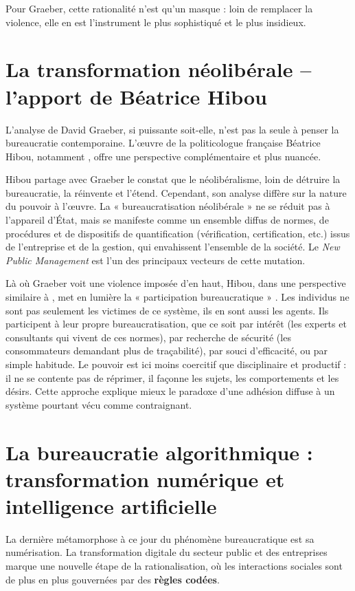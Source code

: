 Pour Graeber, cette rationalité n'est qu'un masque : loin de remplacer la violence, elle en est l'instrument le plus sophistiqué et le plus insidieux.

\section{La transformation néolibérale – l'apport de Béatrice Hibou}

L'analyse de David Graeber, si puissante soit-elle, n'est pas la seule à penser la bureaucratie contemporaine. L'œuvre de la politicologue française Béatrice Hibou, notamment \citep{Hibou2012}, offre une perspective complémentaire et plus nuancée.

Hibou partage avec Graeber le constat que le néolibéralisme, loin de détruire la bureaucratie, la réinvente et l'étend. Cependant, son analyse diffère sur la nature du pouvoir à l'œuvre. La « bureaucratisation néolibérale »  ne se réduit pas à l'appareil d'État, mais se manifeste comme un ensemble diffus de normes, de procédures et de dispositifs de quantification (vérification, certification, etc.) issus de l'entreprise et de la gestion, qui envahissent l'ensemble de la société. Le \textit{New Public Management} est l'un des principaux vecteurs de cette mutation.

Là où Graeber voit une violence imposée d'en haut, Hibou, dans une perspective similaire à \citep{foucault1975surveiller}, met en lumière la « participation bureaucratique » . Les individus ne sont pas seulement les victimes de ce système, ils en sont aussi les agents. Ils participent à leur propre bureaucratisation, que ce soit par intérêt (les experts et consultants qui vivent de ces normes), par recherche de sécurité (les consommateurs demandant plus de traçabilité), par souci d'efficacité, ou par simple habitude. Le pouvoir est ici moins coercitif que disciplinaire et productif : il ne se contente pas de réprimer, il façonne les sujets, les comportements et les désirs. Cette approche explique mieux le paradoxe d'une adhésion diffuse à un système pourtant vécu comme contraignant.

\section{La bureaucratie algorithmique : transformation numérique et intelligence artificielle}

La dernière métamorphose à ce jour du phénomène bureaucratique est sa numérisation. La transformation digitale du secteur public et des entreprises marque une nouvelle étape de la rationalisation, où les interactions sociales sont de plus en plus gouvernées par des \textbf{règles codées}.


